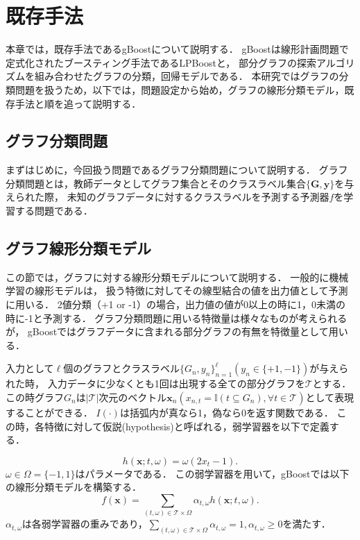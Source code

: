 \chapter{既存手法}
本章では，既存手法であるgBoost\cite{gBoost}について説明する．
gBoostは線形計画問題で定式化されたブースティング手法であるLPBoost\cite{lpboost}と，
部分グラフの探索アルゴリズムを組み合わせたグラフの分類，回帰モデルである．
本研究ではグラフの分類問題を扱うため，以下では，問題設定から始め，グラフの線形分類モデル，既存手法と順を追って説明する．

\section{グラフ分類問題}
まずはじめに，今回扱う問題であるグラフ分類問題について説明する．
グラフ分類問題とは，教師データとしてグラフ集合とそのクラスラベル集合$\{\bm{G},\bm{y}\}$を与えられた際，
未知のグラフデータに対するクラスラベルを予測する予測器$f$を学習する問題である．

\section{グラフ線形分類モデル}
この節では，グラフに対する線形分類モデルについて説明する．
一般的に機械学習の線形モデルは，
扱う特徴に対してその線型結合の値を出力値として予測に用いる．
2値分類（+1 or -1）の場合，出力値の値が0以上の時に1，0未満の時に-1と予測する．
グラフ分類問題に用いる特徴量は様々なものが考えられるが，
gBoostではグラフデータに含まれる部分グラフの有無を特徴量として用いる．

入力として$\ell$個のグラフとクラスラベル$\{G_n, y_n\}^{\ell}_{n=1} (y_n \in \{+1, -1\})$が与えられた時，
入力データに少なくとも1回は出現する全ての部分グラフを$\mathcal{T}$とする．
この時グラフ$G_n$は$|\mathcal{T}|$次元のベクトル$\bm{x}_n(x_{n,t} = \mathbb{I}(t \subseteq G_n), \forall t \in \mathcal{T})$として表現することができる．
$I(\cdot)$は括弧内が真なら1，偽なら0を返す関数である．
この時，各特徴に対して仮説(hypothesis)と呼ばれる，弱学習器を以下で定義する．

\begin{equation*}
	h(\bm{x};t,\omega) = \omega (2x_t - 1).
\end{equation*}
$\omega \in \Omega = \{-1,1\}$はパラメータである．
この弱学習器を用いて，gBoostでは以下の線形分類モデルを構築する．
\begin{equation*}
	f(\bm{x}) = \sum_{(t,\omega) \in \mathcal{T}\times \Omega} \alpha_{t,\omega} h(\bm{x};t,\omega).
\end{equation*}
$\alpha_{t,\omega}$は各弱学習器の重みであり，$\sum_{(t,\omega) \in \mathcal{T}\times \Omega} \alpha_{t,\omega}=1,\alpha_{t,\omega} \geq 0$を満たす．


